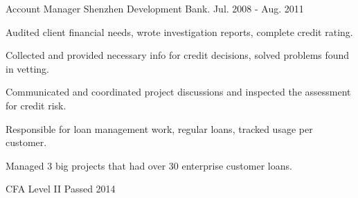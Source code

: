 \documentclass[11pt, a4paper]{awesome-cv}
\begin{document}
\begin{cventries}
  \cventry
    {Account Manager} %
    {Shenzhen Development Bank.} %
    {} %
    {Jul. 2008 - Aug. 2011} %
    {
      \begin{cvitems} %
        \item {Audited client financial needs, wrote investigation reports, complete credit rating.}
        \item {Collected and provided necessary info for credit decisions, solved problems found in vetting.}
        \item {Communicated and coordinated project discussions and inspected the assessment for credit risk.}
        \item {Responsible for loan management work, regular loans, tracked usage per customer.}
        \item {Managed 3 big projects that had over 30 enterprise customer loans.}
      \end{cvitems}
    }

\end{cventries}






\begin{cvhonors}

  \cvhonor
    {CFA Level II Passed} %
    {} %
    {} %
    {2014} %

\end{cvhonors}


\end{document}
